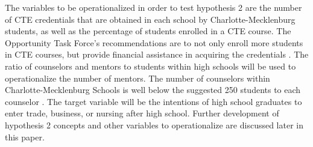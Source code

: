 The variables to be operationalized in order to test hypothesis 2 are the number of CTE credentials that are obtained in each school by Charlotte-Mecklenburg students, as well as the percentage of students enrolled in a CTE course. 
The Opportunity Task Force's recommendations are to not only enroll more students in CTE courses, but provide financial assistance in acquiring the credentials \parencite[][p. 28]{LOO}.
The ratio of counselors and mentors to students within high schools will be used to operationalize the number of mentors. 
The number of counselors within Charlotte-Mecklenburg Schools is well below the suggested 250 students to each counselor \parencite[][p. 30]{LOO}. 
The target variable will be the intentions of high school graduates to enter trade, business, or nursing after high school. 
Further development of hypothesis 2 concepts and other variables to operationalize are discussed later in this paper.
